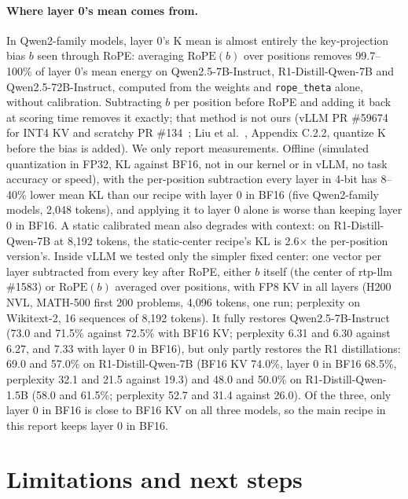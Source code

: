 \documentclass[11pt]{article}
\begin{document}
\paragraph{Where layer 0's mean comes from.} In Qwen2-family models, layer 0's K mean is almost entirely the key-projection bias $b$ seen through RoPE: averaging $\mathrm{RoPE}(b)$ over positions removes 99.7--100\% of layer 0's mean energy on Qwen2.5-7B-Instruct, R1-Distill-Qwen-7B and Qwen2.5-72B-Instruct, computed from the weights and \texttt{rope\_theta} alone, without calibration. Subtracting $b$ per position before RoPE and adding it back at scoring time removes it exactly; that method is not ours (vLLM PR \#59674~\cite{vllm59674} for INT4 KV and scratchy PR \#134~\cite{scratchy134}; Liu et al.~\cite{liu2025quantreasoning}, Appendix C.2.2, quantize K before the bias is added). We only report measurements. Offline (simulated quantization in FP32, KL against BF16, not in our kernel or in vLLM, no task accuracy or speed), with the per-position subtraction every layer in 4-bit has 8--40\% lower mean KL than our recipe with layer 0 in BF16 (five Qwen2-family models, 2,048 tokens), and applying it to layer 0 alone is worse than keeping layer 0 in BF16. A static calibrated mean also degrades with context: on R1-Distill-Qwen-7B at 8,192 tokens, the static-center recipe's KL is 2.6$\times$ the per-position version's. Inside vLLM we tested only the simpler fixed center: one vector per layer subtracted from every key after RoPE, either $b$ itself (the center of rtp-llm \#1583) or $\mathrm{RoPE}(b)$ averaged over positions, with FP8 KV in all layers (H200 NVL, MATH-500 first 200 problems, 4,096 tokens, one run; perplexity on Wikitext-2, 16 sequences of 8,192 tokens). It fully restores Qwen2.5-7B-Instruct (73.0 and 71.5\% against 72.5\% with BF16 KV; perplexity 6.31 and 6.30 against 6.27, and 7.33 with layer 0 in BF16), but only partly restores the R1 distillations: 69.0 and 57.0\% on R1-Distill-Qwen-7B (BF16 KV 74.0\%, layer 0 in BF16 68.5\%, perplexity 32.1 and 21.5 against 19.3) and 48.0 and 50.0\% on R1-Distill-Qwen-1.5B (58.0 and 61.5\%; perplexity 52.7 and 31.4 against 26.0). Of the three, only layer 0 in BF16 is close to BF16 KV on all three models, so the main recipe in this report keeps layer 0 in BF16.

\section{Limitations and next steps}
\label{sec:limits}
\end{document}
